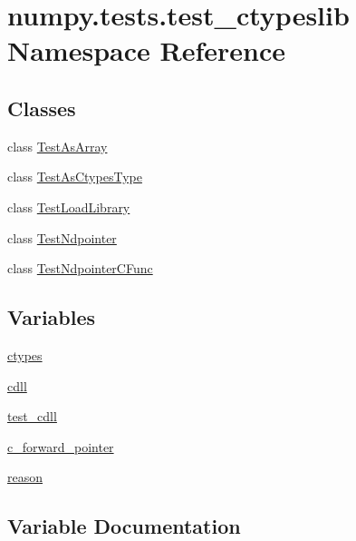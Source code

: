 \hypertarget{namespacenumpy_1_1tests_1_1test__ctypeslib}{}\section{numpy.\+tests.\+test\+\_\+ctypeslib Namespace Reference}
\label{namespacenumpy_1_1tests_1_1test__ctypeslib}
\subsection*{Classes}
\begin{DoxyCompactItemize}
\item 
class \hyperlink{classnumpy_1_1tests_1_1test__ctypeslib_1_1TestAsArray}{Test\+As\+Array}
\item 
class \hyperlink{classnumpy_1_1tests_1_1test__ctypeslib_1_1TestAsCtypesType}{Test\+As\+Ctypes\+Type}
\item 
class \hyperlink{classnumpy_1_1tests_1_1test__ctypeslib_1_1TestLoadLibrary}{Test\+Load\+Library}
\item 
class \hyperlink{classnumpy_1_1tests_1_1test__ctypeslib_1_1TestNdpointer}{Test\+Ndpointer}
\item 
class \hyperlink{classnumpy_1_1tests_1_1test__ctypeslib_1_1TestNdpointerCFunc}{Test\+Ndpointer\+C\+Func}
\end{DoxyCompactItemize}
\subsection*{Variables}
\begin{DoxyCompactItemize}
\item 
\hyperlink{namespacenumpy_1_1tests_1_1test__ctypeslib_a87a12c97f16685a6ddd97a5d1d0eb892}{ctypes}
\item 
\hyperlink{namespacenumpy_1_1tests_1_1test__ctypeslib_acfa8026346f8e5312465585d56269e59}{cdll}
\item 
\hyperlink{namespacenumpy_1_1tests_1_1test__ctypeslib_a731e7eeb989ebc81b9985341a7f6f6b1}{test\+\_\+cdll}
\item 
\hyperlink{namespacenumpy_1_1tests_1_1test__ctypeslib_ab4d48aefcea63ee1f8360388d7760f75}{c\+\_\+forward\+\_\+pointer}
\item 
\hyperlink{namespacenumpy_1_1tests_1_1test__ctypeslib_ad6adbceebc0fd17d193ba9430ca22bc2}{reason}
\end{DoxyCompactItemize}


\subsection{Variable Documentation}
\mbox{\label{namespacenumpy_1_1tests_1_1test__ctypeslib_ab4d48aefcea63ee1f8360388d7760f75}} 
